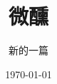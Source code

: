 \documentclass[12pt,openany]{book}  %
\title{微醺}
\date{\today}
\author{新的一篇}
\begin{document}
\maketitle
\newpage

\chapter{}
\end{document}
